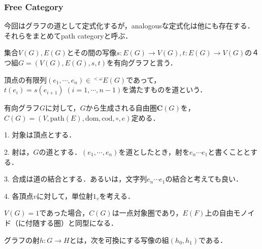 \documentclass[uplatex, dvipdfmx]{jsarticle}
\begin{document}
\subsubsection{Free Category}
今回はグラフの道として定式化するが，analogousな定式化は他にも存在する．それらをまとめてpath categoryと呼ぶ．

\begin{definition*}[有向グラフ]
    集合$V(G),E(G)$とその間の写像$s:E(G)\to V(G), t:E(G)\to V(G)$の４つ組$G=(V(G), E(G), s,t)$を有向グラフと言う．
    \begin{center}
    \end{center}

    頂点の有限列$(e_1,\cdots,e_n)\in {}^{<\omega}\! E(G)$であって，$t(e_i)=s(e_{i+1})\; (i=1,\cdots,n-1)$を満たすものを道という．
\end{definition*}

\begin{definition*}[有向グラフ上の自由圏]
    有向グラフ$G$に対して，$G$から生成される自由圏$\mathbf{C}(G)$を，$C(G)=(V, \mathrm{path}(E),\mathrm{dom}, \mathrm{cod}, \circ ,e)$定める．

    \begin{center}
    \end{center}

    1. 対象は頂点とする．

    2. 射は，$G$の道とする．$(e_1, \cdots, e_n)$を道としたとき，射を$e_n\cdots e_1$と書くこととする．

    3. 合成は道の結合とする．あるいは，文字列$e_n\cdots e_1$の結合と考えても良い．

    4. 各頂点$v$に対して，単位射$1_v$を考える．
\end{definition*}
\begin{example*}
    $V(G)=1$であった場合，$C(G)$は一点対象圏であり，$E(F)$上の自由モノイド（に付随する圏）と同型になる．
\end{example*}

\begin{definition*}[有向グラフ準同型]
    グラフの射$h:G\to H$とは，次を可換にする写像の組$(h_0, h_1)$である．
    \begin{center}
    \end{center}
\end{definition*}
\end{document}
